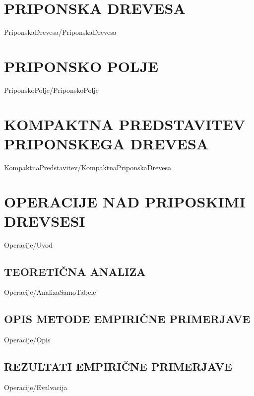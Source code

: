 \documentclass[12pt,a4paper,titlepage,openany,twoside]{report}
\begin{document}
\chapter{PRIPONSKA DREVESA}\label{sec:priponska_drevesa}
\thispagestyle{fancy} 
{PriponskaDrevesa/PriponskaDrevesa}

\chapter{PRIPONSKO POLJE}\label{sec:SA}
\thispagestyle{fancy} 
{PriponskoPolje/PriponskoPolje}

\chapter{KOMPAKTNA PREDSTAVITEV PRIPONSKEGA DREVESA}\label{sec:Kompaktna}
\thispagestyle{fancy} 


{KompaktnaPredstavitev/KompaktnaPriponskaDrevesa}

\chapter{OPERACIJE NAD PRIPOSKIMI DREVSESI}\label{sec:OPeracije}
\thispagestyle{fancy} 
{Operacije/Uvod}



\section{TEORETIČNA ANALIZA}\label{sec:analiza}
{Operacije/AnalizaSamoTabele}


\section{OPIS METODE EMPIRIČNE PRIMERJAVE}\label{sec:opis}
{Operacije/Opis}


\section{REZULTATI EMPIRIČNE PRIMERJAVE}\label{sec:primerjava}
{Operacije/Evalvacija}
\end{document}

